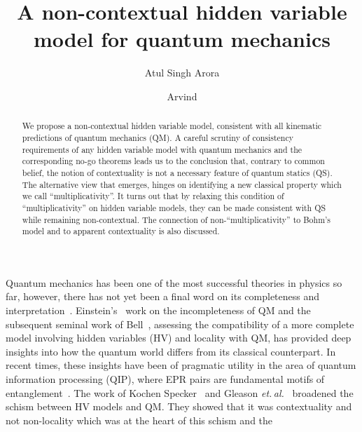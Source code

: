 \documentclass[british,aps,prl,superscriptaddress,nofootinbib,times,reprint]{revtex4-1}
\theoremstyle{plain}
\theoremstyle{plain}
\theoremstyle{definition}
\theoremstyle{remark}
\theoremstyle{remark}
\theoremstyle{remark}
\theoremstyle{plain}
\theoremstyle{plain}
\theoremstyle{plain}
\theoremstyle{definition}
\theoremstyle{definition}
\begin{document}
\title{A non-contextual hidden variable model for quantum mechanics}
\author{Atul Singh Arora}
\author{Arvind}
\begin{abstract}
We propose a non-contextual hidden variable model,
consistent with all kinematic
predictions of quantum
mechanics (QM).  A careful scrutiny of consistency
requirements of any hidden variable model with
quantum mechanics and the corresponding no-go
theorems leads us to the conclusion that,
contrary to common belief,  the notion of
contextuality is not a necessary feature of quantum statics (QS).
The alternative view that emerges, hinges on
identifying a new classical property which we call
``multiplicativity''.  It turns out that by
relaxing this condition of ``multiplicativity'' on
hidden variable models, they can be made
consistent with QS  while remaining
non-contextual.  The connection of
non-``multiplicativity'' to Bohm's model and to
apparent contextuality is also discussed.
\end{abstract}
\pacs{}
\maketitle
Quantum mechanics has been one of the most
successful theories in physics so far, however,
there has not yet been a final word on its
completeness and
interpretation~\cite{BellSpkblUnspkbl}.
Einstein's~\cite{EinsteinEPR} work on the
incompleteness of QM and the subsequent seminal
work of Bell~\cite{BellSpkblUnspkbl}, assessing
the compatibility of a more complete model
involving hidden variables (HV) and locality with
QM, has provided deep insights into  how the
quantum world differs from its classical
counterpart.  In recent times, these insights have
been of pragmatic utility in the area of quantum
information processing (QIP), where EPR pairs are
fundamental motifs of
entanglement~\cite{Ekert,PironioRndmnssCrtfcn,NielsenChuang}.
The work of  Kochen Specker~\cite{KochenSpecker}
and Gleason {\it
et.\,al.}~\cite{Gleason,Peres,Mermin} broadened
the schism between  HV models and QM.  They showed
that it was contextuality and not non-locality
which was at the heart of this schism and the
\end{document}
